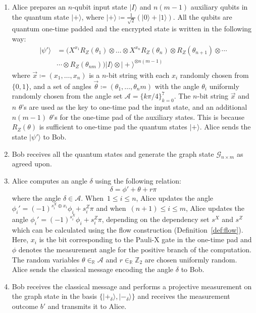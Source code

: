\begin{enumerate}
\item Alice prepares an $n$-qubit input state $|I\rangle$ and $n(m - 1)$ auxiliary qubits in the quantum state $|+\rangle$, where $|+\rangle \coloneqq \frac{1}{\sqrt{2}}(|0\rangle + |1\rangle)$. All the qubits are quantum one-time padded and the encrypted state is written in the following way:
\begin{align}
|\psi' \rangle &=\big( X^{x_{1}}R_Z(\theta_1) \otimes  \dotsc \otimes X^{x_{n}}R_Z(\theta_n) \otimes R_Z(\theta_{n+1}) \otimes \cdots \\ \nonumber
& \cdots \otimes R_Z(\theta_{nm}) \big) | I\rangle \otimes  |+\rangle^{\otimes{n(m-1)}} 
\end{align}
where $\vec x \coloneqq (x_1, \dotsc, x_n)$ is a $n$-bit string with each $x_i$ randomly chosen from $\{0,1\}$, and a set of angles $\vec \theta \coloneqq (\theta_1, \dotsc, \theta_nm)$ with the angle $\theta_i$ uniformly randomly chosen from the angle set $\mathcal{A} = \{k\pi/4\}_{k=0}^{7}$. The $n$-bit string $\vec x$ and $n$ $\theta$'s are used as the key to one-time pad the input state, and an additional $n(m-1)$ $\theta$'s for the one-time pad of the auxiliary states. This is because $R_Z(\theta)$ is sufficient to one-time pad the quantum states $|+\rangle$. Alice sends the state $|\psi'\rangle$ to Bob. 
\item Bob receives all the quantum states and generate the graph state $\mathcal{G}_{n \times m}$ as agreed upon. 
\item Alice computes an angle $\delta$ using the following relation:
\begin{equation}
\delta = \phi' + \theta + r\pi
\end{equation}
where the angle $\delta \in \mathcal{A}$. When~$1 \leq i \leq n$, Alice updates the angle $\phi_i' = (-1)^{s_i^{X}\oplus x_i}\phi_i + s_i^{Z}\pi$  and when~$(n+1) \leq i \leq m $, Alice updates the angle $\phi_i' = (-1)^{s_i^{X}}\phi_i + s_i^{Z}\pi$, depending on the dependency set $s^{X}$ and $s^{Z}$ which can be calculated using the flow construction (Definition~\ref{def:flow}). Here, $x_{i}$ is the bit corresponding to the Pauli-X gate in the one-time pad and $\phi$ denotes the measurement angle for the positive branch of the computation. The random variables $\theta \in_{\mathbb{R}} \mathcal{A}$ and  $r \in_{\mathbb{R}} \mathbb{Z}_{2}$ are chosen uniformly random. Alice sends the classical message encoding the angle $\delta$ to Bob.
\item Bob receives the classical message and performs a projective measurement on the graph state in the basis $\{|+_\delta\rangle, |-_\delta\rangle\}$ and receives the measurement outcome $b'$ and transmits it to  Alice. 

\end{enumerate}
